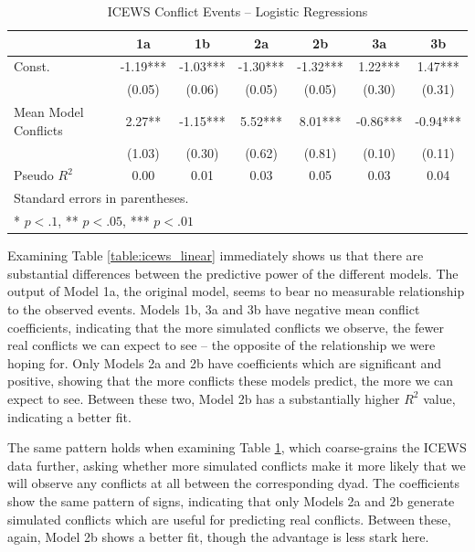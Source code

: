 \begin{table}
\begin{center}
    \caption{ICEWS Conflict Events -- Logistic Regressions}
    \label{table:icews_logit}
\begin{tabular}{lcccccc}
    \hline
                    &    1a   &    1b    &    2a    &    2b    &    3a    &    3b     \\
    \hline
    Const.          & -1.19*** & -1.03*** & -1.30*** & -1.32*** & 1.22***  & 1.47***   \\
                    & (0.05)   & (0.06)   & (0.05)   & (0.05)   & (0.30)   & (0.31)    \\
    Mean Model Conflicts & 2.27**   & -1.15*** & 5.52***  & 8.01***  & -0.86*** & -0.94***  \\
                    & (1.03)   & (0.30)   & (0.62)   & (0.81)   & (0.10)   & (0.11)    \\
    \hline
    Pseudo $R^2$      & 0.00     & 0.01     & 0.03     & 0.05     & 0.03     & 0.04      \\
    \hline
    \hline
    \multicolumn{7}{l}{Standard errors in parentheses.} \\
    \multicolumn{7}{l}{* $p<.1$, ** $p<.05$, *** $p<.01$} \\
    \end{tabular}
    \end{center}
\tableSpace
\end{table}

Examining Table \ref{table:icews_linear} immediately shows us that there are substantial differences between the predictive power of the different models. The output of Model 1a, the original model, seems to bear no measurable relationship to the observed events. Models 1b, 3a and 3b have negative mean conflict coefficients, indicating that the more simulated conflicts we observe, the fewer real conflicts we can expect to see -- the opposite of the relationship we were hoping for. Only Models 2a and 2b have coefficients which are significant and positive, showing that the more conflicts these models predict, the more we can expect to see. Between these two, Model 2b has a substantially higher $R^2$ value, indicating a better fit. 

The same pattern holds when examining Table \ref{table:icews_logit}, which coarse-grains the ICEWS data further, asking whether more simulated conflicts make it more likely that we will observe any conflicts at all between the corresponding dyad. The coefficients show the same pattern of signs, indicating that only Models 2a and 2b generate simulated conflicts which are useful for predicting real conflicts. Between these, again, Model 2b shows a better fit, though the advantage is less stark here.

